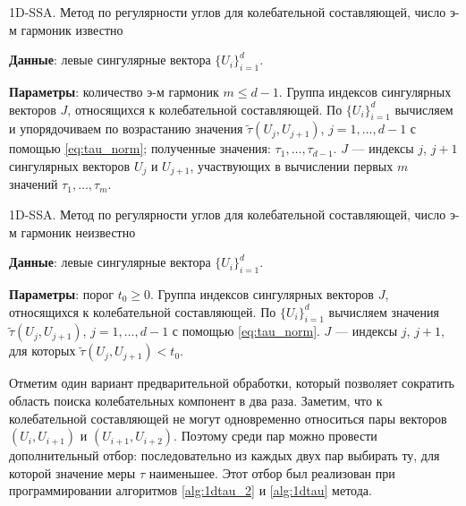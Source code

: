 \documentclass[specialist,
               substylefile = spbu.rtx,
               subf,href,colorlinks=true, 12pt]{disser}
\begin{document}
\begin{algorithm}[!hhh]
\caption{1D-SSA. Метод по регулярности углов для колебательной составляющей, число э-м гармоник известно}
\label{alg:1dtau_2}
\begin{algorithmic}[1]
\REQUIRE 
\item \textbf{Данные}: левые сингулярные вектора $\{U_i\}_{i=1}^{d}$.
\item \textbf{Параметры}: количество э-м гармоник $m \leqslant d - 1$.
\ENSURE Группа индексов сингулярных векторов $J$, относящихся к колебательной составляющей.
\STATE По $\{U_i\}_{i=1}^{d}$ вычисляем и упорядочиваем по возрастанию значения $\tilde{\tau}(U_j, U_{j+1})$, $j=1,\ldots, d-1$ с помощью \eqref{eq:tau_norm}; полученные значения: $\tau_1, \ldots, \tau_{d-1}$.
\STATE $J$ --- индексы $j$, $j+1$ сингулярных векторов $U_j$ и $U_{j+1}$, участвующих в вычислении первых $m$ значений $\tau_1, \ldots, \tau_m$.
\end{algorithmic}
\end{algorithm}

\begin{algorithm}[!hhh]
\caption{1D-SSA. Метод по регулярности углов для колебательной составляющей, число э-м гармоник неизвестно}
\label{alg:1dtau}
\begin{algorithmic}[1]
\REQUIRE 
\item \textbf{Данные}: левые сингулярные вектора $\{U_i\}_{i=1}^{d}$.
\item \textbf{Параметры}: порог $t_0 \geqslant 0$.
\ENSURE Группа индексов сингулярных векторов $J$, относящихся к колебательной составляющей.
\STATE По $\{U_i\}_{i=1}^{d}$ вычисляем значения $\tilde{\tau}(U_j, U_{j+1})$, $j=1,\ldots, d-1$ с помощью \eqref{eq:tau_norm}.
\STATE  $J$ --- индексы $j$, $j+1$, для которых $\tilde{\tau}(U_j, U_{j+1}) < t_0$.
\end{algorithmic}
\end{algorithm}

Отметим один вариант предварительной обработки, который позволяет сократить область поиска колебательных компонент в два раза.
Заметим, что к колебательной составляющей не могут одновременно относиться пары векторов $(U_i, U_{i+1})$ и $(U_{i+1}, U_{i+2})$. Поэтому среди пар можно провести дополнительный отбор: последовательно из каждых двух пар выбирать ту, для которой значение меры $\tau$ наименьшее. Этот отбор был реализован при программировании алгоритмов \ref{alg:1dtau_2} и \ref{alg:1dtau} метода. 
\end{document}
